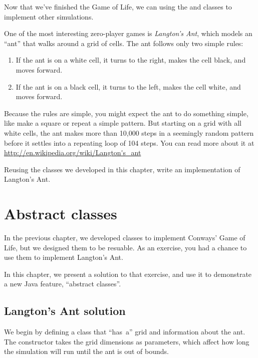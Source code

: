 \begin{exercise}

Now that we've finished the Game of Life, we can 
using the  and  classes to
implement other simulations.

One of the most interesting zero-player games is {\it Langton's Ant}, which models an ``ant'' that walks around a grid of cells.
The ant follows only two simple rules:

\begin{enumerate}
\item If the ant is on a white cell, it turns to the right, makes the cell black, and moves forward.
\item If the ant is on a black cell, it turns to the left, makes the cell white, and moves forward.
\end{enumerate}

Because the rules are simple, you might expect the ant to do something simple, like make a square or repeat a simple pattern.
But starting on a grid with all white cells, the ant makes more than 10,000 steps in a seemingly random pattern before it settles into a repeating loop of 104 steps.
You can read more about it at \url{http://en.wikipedia.org/wiki/Langton's_ant}

Reusing the classes we developed in this chapter, write an implementation of Langton's Ant.

\end{exercise}



\chapter{Abstract classes}

In the previous chapter, we developed classes to implement Conways' Game of Life, but we designed them to be resuable.
As an exercise, you had a chance to use them to implement Langton's Ant.

In this chapter, we present a solution to that exercise, and use it to demonstrate a new Java feature, ``abstract classes''.

\section{Langton's Ant solution}

We begin by defining a  class that ``has~a'' grid and information about the ant.
The constructor takes the grid dimensions as parameters, which affect how long the simulation will run until the ant is out of bounds.

